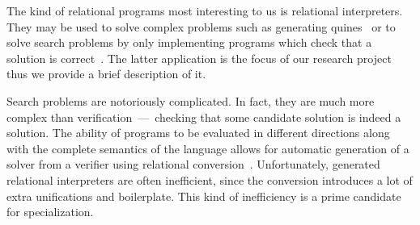 The kind of relational programs most interesting to us is relational interpreters.
They may be used to solve complex problems such as generating quines~\cite{byrd2012minikanren} or to solve search problems by only implementing programs which check that a solution is correct~\cite{lozov2019relational}.
The latter application is the focus of our research project thus we provide a brief description of it.

Search problems are notoriously complicated.
In fact, they are much more complex than verification~---~checking that some candidate solution is indeed a solution.
The ability of \mk programs to be evaluated in different directions along with the complete semantics of the language allows for automatic generation of a solver from a verifier using relational conversion~\cite{lozov2017typed}.
Unfortunately, generated relational interpreters are often inefficient, since the conversion introduces a lot of extra unifications and boilerplate.
This kind of inefficiency is a prime candidate for specialization.


